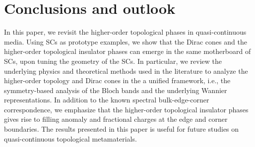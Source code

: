 \documentclass[doublecol]{epl2}
\begin{document}



\section{Conclusions and outlook}
In this paper, we revisit the higher-order topological phases in quasi-continuous media. Using SCs as prototype examples, we show that the Dirac cones and the higher-order topological insulator phases can emerge in the same motherboard of SCs, upon tuning the geometry of the SCs. In particular, we review the underlying physics and theoretical methods used in the literature to analyze the higher-order topology and Dirac cones in the a unified framework, i.e., the symmetry-based analysis of the Bloch bands and the underlying Wannier representations. In addition to the known spectral bulk-edge-corner correspondence, we emphasize that the higher-order topological insulator phases gives rise to filling anomaly and fractional charges at the edge and corner boundaries. The results presented in this paper is useful for future studies on quasi-continuous topological metamaterials. 
\end{document}
